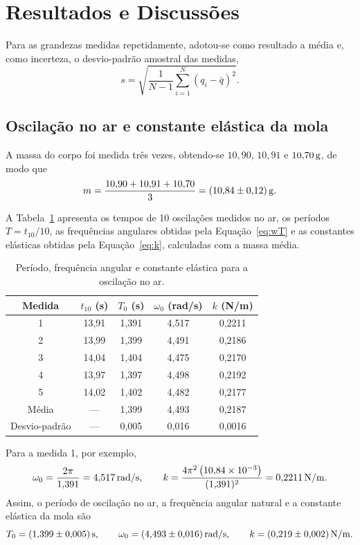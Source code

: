 \section{Resultados e Discussões}

Para as grandezas medidas repetidamente, adotou-se como resultado a média e, como incerteza, o desvio-padrão amostral das medidas,
\[
s=\sqrt{\frac{1}{N-1}\sum_{i=1}^{N}\left(q_i-\bar{q}\right)^2}.
\]

\subsection{Oscilação no ar e constante elástica da mola}

A massa do corpo foi medida três vezes, obtendo-se $10{,}90$, $10{,}91$ e $10{,}70\,\mathrm{g}$, de modo que
\[
m=\frac{10{,}90+10{,}91+10{,}70}{3}=(10{,}84\pm0{,}12)\,\mathrm{g}.
\]

A Tabela~\ref{tab:ar} apresenta os tempos de 10 oscilações medidos no ar, os períodos $T=t_{10}/10$, as frequências angulares obtidas pela Equação~\eqref{eq:wT} e as constantes elásticas obtidas pela Equação~\eqref{eq:k}, calculadas com a massa média.

\begin{table}[H]
\centering
\caption{Período, frequência angular e constante elástica para a oscilação no ar.}
\label{tab:ar}
\begin{tabular}{ccccc}
\toprule
Medida & $t_{10}$ (s) & $T_0$ (s) & $\omega_0$ (rad/s) & $k$ (N/m) \\
\midrule
1 & 13,91 & 1,391 & 4,517 & 0,2211 \\
2 & 13,99 & 1,399 & 4,491 & 0,2186 \\
3 & 14,04 & 1,404 & 4,475 & 0,2170 \\
4 & 13,97 & 1,397 & 4,498 & 0,2192 \\
5 & 14,02 & 1,402 & 4,482 & 0,2177 \\
\midrule
Média & --- & 1,399 & 4,493 & 0,2187 \\
Desvio-padrão & --- & 0,005 & 0,016 & 0,0016 \\
\bottomrule
\end{tabular}
\end{table}

Para a medida 1, por exemplo,
\[
\omega_0=\frac{2\pi}{1{,}391}=4{,}517\,\mathrm{rad/s},
\qquad
k=\frac{4\pi^2\left(10{,}84\times10^{-3}\right)}{(1{,}391)^2}=0{,}2211\,\mathrm{N/m}.
\]
Assim, o período de oscilação no ar, a frequência angular natural e a constante elástica da mola são
\[
T_0=(1{,}399\pm0{,}005)\,\mathrm{s},
\qquad
\omega_0=(4{,}493\pm0{,}016)\,\mathrm{rad/s},
\qquad
k=(0{,}219\pm0{,}002)\,\mathrm{N/m}.
\]

